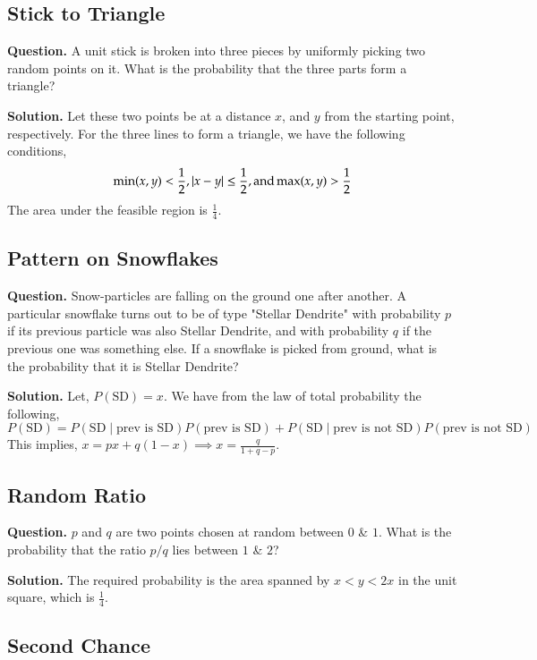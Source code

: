 \subsection{Stick to Triangle}

\textbf{Question.} A unit stick is broken into three pieces by uniformly picking two random points on it. What is the probability that the three parts form a triangle?

\textbf{Solution.} Let these two points be at a distance $x$, and $y$ from the starting point, respectively. For the three lines to form a triangle, we have the following conditions, 
\[\min(x,y) < \frac{1}{2}, \space |x-y| \leq \frac{1}{2}, \text{and} \space \max(x,y) > \frac{1}{2}\]
The area under the feasible region is $\frac{1}{4}$.

\subsection{Pattern on Snowflakes}

\textbf{Question.} Snow-particles are falling on the ground one after another. A particular snowflake turns out to be of type "Stellar Dendrite" with probability $p$ if its previous particle was also Stellar Dendrite, and with probability $q$ if the previous one was something else. If a snowflake is picked from ground, what is the probability that it is Stellar Dendrite?

\textbf{Solution.} Let, $P(\text{SD}) = x$. We have from the law of total probability the following, \[P(\text{SD}) = P(\text{SD} \mid \text{prev is SD}) P(\text{prev is SD}) + P(\text{SD} \mid \text{prev is not SD}) P(\text{prev is not SD})\]
This implies, $x = px + q (1-x) \implies x = \frac{q}{1+q-p}$.

\subsection{Random Ratio}

\textbf{Question.} $p$ and $q$ are two points chosen at random between $0$ \& $1$. What is the probability that the ratio $p/q$ lies between $1$ \& $2$?

\textbf{Solution.} The required probability is the area spanned by $x < y < 2x$ in the unit square, which is $\frac{1}{4}$.

\subsection{Second Chance}

